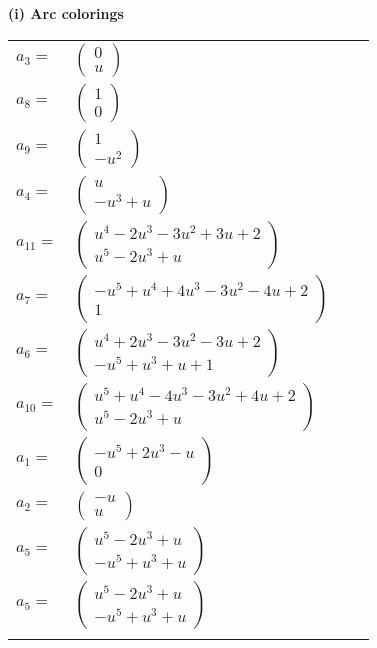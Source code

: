 \documentclass[1p]{elsarticle_modified}
\theoremstyle{definition}
\begin{document}
\flushleft \textbf{(i) Arc colorings}\\
\begin{tabular}{m{7pt} m{180pt} m{7pt} m{180pt} }
\flushright $a_{3}=$&$\begin{pmatrix}0\\u\end{pmatrix}$ \\
\flushright $a_{8}=$&$\begin{pmatrix}1\\0\end{pmatrix}$ \\
\flushright $a_{9}=$&$\begin{pmatrix}1\\- u^2\end{pmatrix}$ \\
\flushright $a_{4}=$&$\begin{pmatrix}u\\- u^3+u\end{pmatrix}$ \\
\flushright $a_{11}=$&$\begin{pmatrix}u^4-2 u^3-3 u^2+3 u+2\\u^5-2 u^3+u\end{pmatrix}$ \\
\flushright $a_{7}=$&$\begin{pmatrix}- u^5+u^4+4 u^3-3 u^2-4 u+2\\1\end{pmatrix}$ \\
\flushright $a_{6}=$&$\begin{pmatrix}u^4+2 u^3-3 u^2-3 u+2\\- u^5+u^3+u+1\end{pmatrix}$ \\
\flushright $a_{10}=$&$\begin{pmatrix}u^5+u^4-4 u^3-3 u^2+4 u+2\\u^5-2 u^3+u\end{pmatrix}$ \\
\flushright $a_{1}=$&$\begin{pmatrix}- u^5+2 u^3- u\\0\end{pmatrix}$ \\
\flushright $a_{2}=$&$\begin{pmatrix}- u\\u\end{pmatrix}$ \\
\flushright $a_{5}=$&$\begin{pmatrix}u^5-2 u^3+u\\- u^5+u^3+u\end{pmatrix}$\\ \flushright $a_{5}=$&$\begin{pmatrix}u^5-2 u^3+u\\- u^5+u^3+u\end{pmatrix}$\\&\end{tabular}
\end{document}

